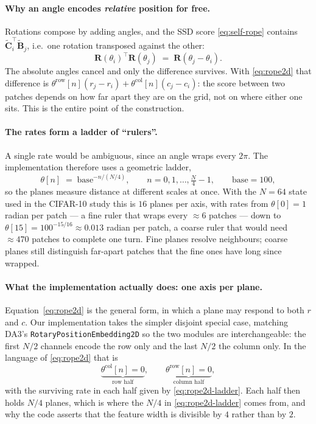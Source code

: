 \documentclass[11pt,a4paper]{article}
\begin{document}
\paragraph{Why an angle encodes \emph{relative} position for free.}
Rotations compose by adding angles, and the SSD score
\eqref{eq:self-rope} contains $\widetilde{\bm{C}}_i^\top\widetilde{\bm{B}}_j$,
i.e.\ one rotation transposed against the other:
\begin{equation}
  \bm{R}(\theta_i)^\top\bm{R}(\theta_j) \;=\; \bm{R}(\theta_j-\theta_i).
\end{equation}
The absolute angles cancel and only the difference survives. With
\eqref{eq:rope2d} that difference is
$\theta^{\text{row}}[n](r_j-r_i)+\theta^{\text{col}}[n](c_j-c_i)$: the score
between two patches depends on how far apart they are on the grid, not on where
either one sits. This is the entire point of the construction.

\paragraph{The rates form a ladder of ``rulers''.}
A single rate would be ambiguous, since an angle wraps every $2\pi$. The
implementation therefore uses a geometric ladder,
\begin{equation}\label{eq:rope2d-ladder}
  \theta[n] \;=\; \text{base}^{-n/(N/4)},
  \qquad n = 0,1,\dots,\tfrac{N}{4}-1,
  \qquad \text{base} = 100 ,
\end{equation}
so the planes measure distance at different scales at once. With the
$N=64$ state used in the CIFAR-10 study this is $16$ planes per axis, with
rates from $\theta[0]=1$ radian per patch --- a fine ruler that wraps every
$\approx 6$ patches --- down to
$\theta[15]=100^{-15/16}\approx0.013$ radian per patch, a coarse ruler that
would need $\approx 470$ patches to complete one turn. Fine planes resolve
neighbours; coarse planes still distinguish far-apart patches that the fine ones
have long since wrapped.

\paragraph{What the implementation actually does: one axis per plane.}
Equation~\eqref{eq:rope2d} is the general form, in which a plane may respond to
both $r$ and $c$. Our implementation takes the simpler disjoint special case,
matching DA3's \texttt{RotaryPositionEmbedding2D} so the two modules are
interchangeable: the first $N/2$ channels encode the row only and the last $N/2$
the column only. In the language of \eqref{eq:rope2d} that is
\begin{equation}
  \underbrace{\theta^{\text{col}}[n]=0}_{\text{row half}},
  \qquad
  \underbrace{\theta^{\text{row}}[n]=0}_{\text{column half}},
\end{equation}
with the surviving rate in each half given by \eqref{eq:rope2d-ladder}. Each
half then holds $N/4$ planes, which is where the $N/4$ in
\eqref{eq:rope2d-ladder} comes from, and why the code asserts that the feature
width is divisible by $4$ rather than by $2$.
\end{document}
